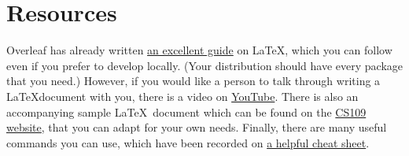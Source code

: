 \documentclass[11pt]{article}
\begin{document}
\section*{Resources}
Overleaf has already written \href{https://www.overleaf.com/learn/latex/Learn_LaTeX_in_30_minutes}{an excellent guide} on \LaTeX, which you can follow even if you prefer to develop locally.
(Your distribution should have every package that you need.)
However, if you would like a person to talk through writing a \LaTeX document with you, there is a video on \href{https://www.youtube.com/watch?v=aF3E2ZOom1o&feature=youtu.be}{YouTube}. 
There is also an accompanying sample \LaTeX\ document which can be found on the \href{cs109.stanford.edu}{CS109 website}, that you can adapt for your own needs.
Finally, there are many useful commands you can use, which have been recorded on \href{https://www.nyu.edu/projects/beber/files/Chang_LaTeX_sheet.pdf}{a helpful cheat sheet}. 
\end{document}
